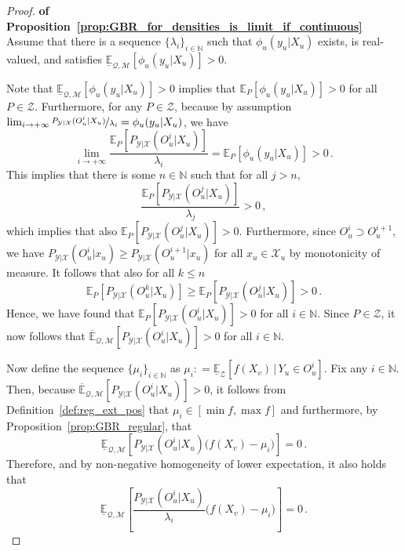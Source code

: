 \documentclass[twoside,11pt]{article}
\newcommand{\nats}{\mathbb{N}}
\newcommand{\states}{\mathcal{X}}
\newcommand{\observs}{\mathcal{Y}}
\newcommand{\lexp}{\underline{\mathbb{E}}_{\rateset,\mathcal{M}}}
\newcommand{\uexp}{\overline{\mathbb{E}}_{\rateset,\mathcal{M}}}
\newcommand{\rateset}{\mathcal{Q}}
\newcommand{\coloneqq}{:\!=}
\begin{document}
\begin{proof}{\bf of Proposition~\ref{prop:GBR_for_densities_is_limit_if_continuous}~}
Assume that there is a sequence $\{\lambda_i\}_{i\in\nats}$ such that $\phi_u(y_u\vert X_u)$ exists, is real-valued, and satisfies $\lexp[\phi_u(y_u\vert X_u)] >0$. 

Note that $\lexp[\phi_u(y_u\vert X_u)] >0$ implies that $\mathbb{E}_{P}[\phi_u(y_u\vert X_u)]>0$ for all $P\in\mathcal{Z}$. Furthermore, for any $P\in\mathcal{Z}$, because by assumption $\lim_{i\to+\infty}\nicefrac{P_{\observs\vert\states}(O_u^i\vert X_u)}{\lambda_i}=\phi_u(y_u\vert X_u)$, we have
\begin{equation*}
\lim_{i\to+\infty}\frac{\mathbb{E}_P[P_{\observs\vert\states}(O_u^i\vert X_u)]}{\lambda_i} = \mathbb{E}_{P}[\phi_u(y_u\vert X_u)] > 0\,.
\end{equation*}
This implies that there is some $n\in\nats$ such that for all $j>n$,
\begin{equation*}
\frac{\mathbb{E}_P[P_{\observs\vert\states}(O_u^j\vert X_u)]}{\lambda_j} > 0\,,
\end{equation*}
which implies that also $\mathbb{E}_P[P_{\observs\vert\states}(O_u^j\vert X_u)] >0$. Furthermore, since $O_u^i\supset O_u^{i+1}$, we have $P_{\observs\vert\states}(O_u^i\vert x_u)\geq P_{\observs\vert\states}(O_u^{i+1}\vert x_u)$ for all $x_u\in\states_u$ by monotonicity of measure. It follows that also for all $k\leq n$
\begin{equation*}
\mathbb{E}_P[P_{\observs\vert\states}(O_u^k\vert X_u)] \geq \mathbb{E}_P[P_{\observs\vert\states}(O_u^j\vert X_u)] > 0\,.
\end{equation*}
Hence, we have found that $\mathbb{E}_P[P_{\observs\vert\states}(O_u^i\vert X_u)]>0$ for all $i\in\nats$. Since $P\in\mathcal{Z}$, it now follows that $\uexp[P_{\observs\vert\states}(O_u^i\vert X_u)]>0$ for all $i\in\nats$.

Now define the sequence $\{\mu_i\}_{i\in\nats}$ as $\mu_i\coloneqq \underline{\mathbb{E}}_\mathcal{Z}[f(X_v)\,\vert\,Y_u\in O_u^i]$.
Fix any $i\in\nats$. Then, because $\uexp[P_{\observs\vert\states}(O_u^i\vert X_u)]>0$, it follows from Definition~\ref{def:reg_ext_pos} that $\mu_i\in[\min f, \max f]$ and furthermore, by Proposition~\ref{prop:GBR_regular}, that
\begin{equation*}
\lexp[P_{\observs\vert\states}(O_u^i\vert X_u)\bigl(f(X_v) - \mu_i\bigr)] = 0\,.
\end{equation*}
Therefore, and by non-negative homogeneity of lower expectation, it also holds that
\begin{equation}\label{eq:nat_ext_limit:steps_are_roots}
\lexp\left[\frac{P_{\observs\vert\states}(O_u^i\vert X_u)}{\lambda_i}\bigl(f(X_v) - \mu_i\bigr)\right] = 0\,.
\end{equation}


\end{proof}
\end{document}
